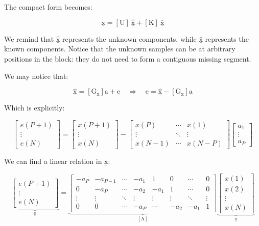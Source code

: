 The compact form becomes:

\[
\underline{\mathrm{x}} = \left[\mathrm{U}\right] \ \underline{\hat{\mathrm{x}}} + \left[\mathrm{K}\right] \ \underline{\bar{\mathrm{x}}}
\]

We remind that \(\underline{\hat{\mathrm{x}}}\) represents the unknown components, while \(\underline{\bar{\mathrm{x}}}\) represents the known components.
Notice that the unknown samples can be at arbitrary positions in the block: they do not need to form a contiguous missing segment.

We may notice that:

\[
\underline{\hat{\mathrm{x}}} = \left[\mathrm{G_x}\right]\underline{\mathrm{a}} + \underline{\mathrm{e}}
\quad \Rightarrow \quad
\underline{\mathrm{e}} = \underline{\hat{\mathrm{x}}} - \left[\mathrm{G_x}\right]\underline{\mathrm{a}}
\]

Which is explicitly:

\[
\begin{bmatrix}
e(P+1) \\[3pt]
\vdots \\[3pt]
e(N)
\end{bmatrix}
=
\begin{bmatrix}
x(P+1) \\[3pt]
\vdots \\[3pt]
x(N)
\end{bmatrix}
-
\begin{bmatrix}
x(P) & \cdots & x(1) \\[3pt]
\vdots & \ddots & \vdots \\[3pt]
x(N-1) & \cdots & x(N-P)
\end{bmatrix}
\begin{bmatrix}
a_1 \\[3pt]
\vdots \\[3pt]
a_P
\end{bmatrix}
\]

\clearpage

We can find a linear relation in $\underline{\mathrm{x}}$:

\[
\underbrace{
\begin{bmatrix}
e(P+1) \\[3pt]
\vdots \\[3pt]
e(N)
\end{bmatrix}}_{\underline{\mathrm{e}}}
=
\underbrace{
\begin{bmatrix}
-a_P & -a_{P-1} & \cdots & -a_1 & 1 & 0 & \cdots & 0 \\[3pt]
0 & -a_P & \cdots & -a_2 & -a_1 & 1 & \cdots & 0 \\[3pt]
\vdots & \vdots & \ddots & \vdots & \vdots & \vdots & \ddots & \vdots \\[3pt]
0 & 0 & \cdots & -a_P & \cdots & -a_2 & -a_1 & 1
\end{bmatrix}}_{\left[\mathrm{A}\right]}
\underbrace{
\begin{bmatrix}
x(1) \\[3pt]
x(2) \\[3pt]
\vdots \\[3pt]
x(N)
\end{bmatrix}}_{\underline{\mathrm{x}}}
\]


